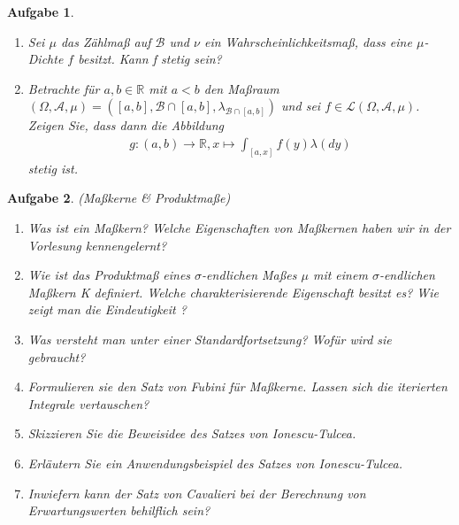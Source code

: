 \documentclass[11pt, a4paper, ngerman]{article}
\newcommand{\R}{\mathbb{R}}
\newtheorem{aufgabe}{Aufgabe}
\begin{document}
\begin{aufgabe}
\begin{enumerate}
\begin{align*}
        \end{align*}
        nicht $\mu$-integrierbar ist. 
        \item
        Sei $\mu$ das Zählmaß auf $\mathcal{B}$ und $\nu$ ein  Wahrscheinlichkeitsmaß, dass eine $\mu$-Dichte $f$ besitzt. Kann f stetig sein? 
        \item 
        Betrachte für $a,b \in \R$ mit $a < b$ den Maßraum $(\Omega, \mathcal{A}, \mu) = ([a,b], \mathcal{B} \cap [a,b], \lambda_{\mathcal{B}\cap [a,b]})$ und sei $f \in \mathcal{L}(\Omega, \mathcal{A}, \mu)$. 
        Zeigen Sie, dass dann die Abbildung 
        \begin{align*}
            g : (a,b) \to \R, x \mapsto \int_{[a,x]}f(y)\lambda(dy)
        \end{align*}
        stetig ist. 

    
    \end{enumerate}
\end{aufgabe}

\begin{aufgabe} (Maßkerne \& Produktmaße)
    \begin{enumerate}
        \item 
        Was ist ein Maßkern? Welche Eigenschaften von Maßkernen haben wir in der Vorlesung kennengelernt? 
        \item
        Wie ist das Produktmaß eines $\sigma$-endlichen Maßes $\mu$ mit einem  $\sigma$-endlichen Maßkern K definiert. Welche charakterisierende Eigenschaft besitzt es?
        Wie zeigt man die Eindeutigkeit ? 
        \item 
        Was versteht man unter einer Standardfortsetzung? Wofür wird sie gebraucht?
        \item 
        Formulieren sie den Satz von Fubini für Maßkerne. Lassen sich die iterierten Integrale vertauschen? 
        \item
        Skizzieren Sie die Beweisidee des Satzes von Ionescu-Tulcea. 
        \item 
        Erläutern Sie ein Anwendungsbeispiel des Satzes von Ionescu-Tulcea. 
        \item 
        Inwiefern kann der Satz von Cavalieri bei der Berechnung von Erwartungswerten behilflich sein? 
    \end{enumerate}
\end{aufgabe}
\end{document}
